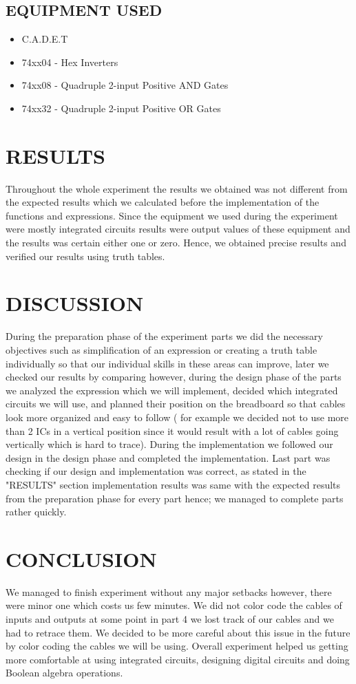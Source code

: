 \documentclass[pdftex,12pt,a4paper]{article}
\begin{document}
\subsection{EQUIPMENT USED}
\begin{itemize}
    \item C.A.D.E.T
    \item 74xx04 - Hex Inverters
    \item 74xx08 - Quadruple 2-input Positive AND Gates
    \item 74xx32 - Quadruple 2-input Positive OR Gates
\end{itemize}

\clearpage
\section{RESULTS}
Throughout the whole experiment the results we obtained was not different from the expected results which we calculated before the implementation of the functions and expressions. Since the equipment we used during the experiment were mostly integrated circuits results were output values of these equipment and the results was certain either one or zero. Hence, we obtained precise results and verified our results using truth tables.


\section{DISCUSSION}
During the preparation phase of the experiment parts we did the necessary objectives such as simplification of an expression or creating a truth table individually so that our individual skills in these areas can improve, later we checked our results by comparing however, during the design phase of the parts we analyzed the expression which we will implement, decided which integrated circuits we will use, and planned their position on the breadboard so that cables look more organized and easy to follow ( for example we decided not to use more than 2 ICs in a vertical position since it would result with a lot of cables going vertically which is hard to trace). During the implementation we followed our design in the design phase and completed the implementation. Last part was checking if our design and implementation was correct, as stated in the "RESULTS" section implementation results was same with the expected results from the preparation phase for every part hence; we managed to complete parts rather quickly.

\section{CONCLUSION}
We managed to finish experiment without any major setbacks however, there were minor one which costs us few minutes. We did not color code the cables of inputs and outputs at some point in part 4 we lost track of our cables and we had to retrace them. We decided to be more careful about this issue in the future by color coding the cables we will be using. Overall experiment helped us getting more comfortable at using integrated circuits, designing digital circuits and doing Boolean algebra operations.


\newpage
\nocite{*}



\end{document}
